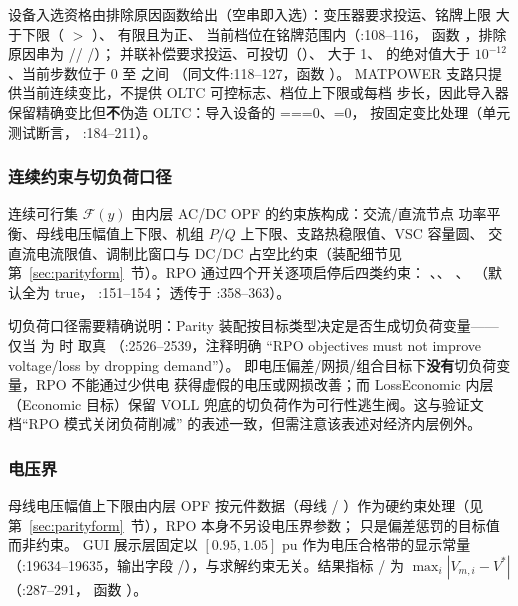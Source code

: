 设备入选资格由排除原因函数给出（空串即入选）：变压器要求投运、铭牌上限
大于下限（ $>$ ）、
有限且为正、
当前档位在铭牌范围内（:108--116，
函数 ，排除原因串为
/\allowbreak{}/\allowbreak
{}/\allowbreak{}）；
并联补偿要求投运、可投切（）、 大于 1、
 的绝对值大于 $10^{-12}$、当前步数位于 0 至
 之间
（同文件:118--127，函数 ）。
MATPOWER 支路只提供当前连续变比，不提供 OLTC 可控标志、档位上下限或每档
步长，因此导入器保留精确变比但\textbf{不}伪造 OLTC：导入设备的
===0、=0，
按固定变比处理（单元测试断言，
:184--211）。

\subsubsection*{连续约束与切负荷口径}
连续可行集 $\mathcal{F}(y)$ 由内层 AC/DC OPF 的约束族构成：交流/直流节点
功率平衡、母线电压幅值上下限、机组 $P/Q$ 上下限、支路热稳限值、VSC 容量圆、
交直流电流限值、调制比窗口与 DC/DC 占空比约束（装配细节见
第~\ref{sec:parityform}~节）。RPO 通过四个开关逐项启停后四类约束：
、、
、
（默认全为 true，
:151--154；
透传于 :358--363）。

切负荷口径需要精确说明：Parity 装配按目标类型决定是否生成切负荷变量——
仅当  为  时
 取真
（:2526--2539，注释明确
“RPO objectives must not improve voltage/loss by dropping demand”）。
即电压偏差/网损/组合目标下\textbf{没有}切负荷变量，RPO 不能通过少供电
获得虚假的电压或网损改善；而 LossEconomic 内层（Economic 目标）保留
VOLL 兜底的切负荷作为可行性逃生阀。这与验证文档“RPO 模式关闭负荷削减”
的表述一致，但需注意该表述对经济内层例外。

\subsubsection*{电压界}
母线电压幅值上下限由内层 OPF 按元件数据（母线 /
）作为硬约束处理（见第~\ref{sec:parityform}~节），RPO
本身不另设电压界参数； 只是偏差惩罚的目标值而非约束。
GUI 展示层固定以 $[0.95,1.05]$ pu 作为电压合格带的显示常量
（:19634--19635，输出字段
/），与求解约束无关。结果指标
/ 为
$\max_i |V_{m,i}-V^{*}|$
（:287--291，
函数 ）。

